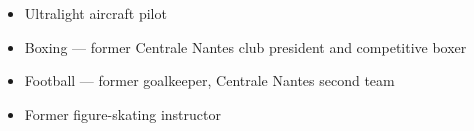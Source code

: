 \vspace{0.6em}

{\small
\begin{itemize}
  \item Ultralight aircraft pilot
  \item Boxing — former Centrale Nantes club president and competitive boxer
  \item Football — former goalkeeper, Centrale Nantes second team
  \item Former figure-skating instructor
\end{itemize}}
